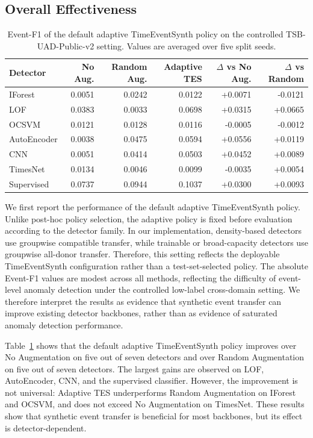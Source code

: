 \documentclass[conference]{IEEEtran}
\begin{document}
\FloatBarrier
\subsection{Overall Effectiveness}
\label{sec:overall_effectiveness}

\begin{table}[!t]
\centering
\caption{Event-F1 of the default adaptive TimeEventSynth policy on the controlled TSB-UAD-Public-v2 setting.  Values are averaged over five split seeds.}
\label{tab:adaptive_main_results}
\begin{tabular}{lrrrrr}
\toprule
Detector & No Aug. & Random Aug. & Adaptive TES & $\Delta$ vs No Aug. & $\Delta$ vs Random \\
\midrule
IForest     & 0.0051 & 0.0242 & 0.0122 & +0.0071 & -0.0121 \\
LOF         & 0.0383 & 0.0033 & 0.0698 & +0.0315 & +0.0665 \\
OCSVM       & 0.0121 & 0.0128 & 0.0116 & -0.0005 & -0.0012 \\
AutoEncoder & 0.0038 & 0.0475 & 0.0594 & +0.0556 & +0.0119 \\
CNN         & 0.0051 & 0.0414 & 0.0503 & +0.0452 & +0.0089 \\
TimesNet    & 0.0134 & 0.0046 & 0.0099 & -0.0035 & +0.0054 \\
Supervised  & 0.0737 & 0.0944 & 0.1037 & +0.0300 & +0.0093 \\
\bottomrule
\end{tabular}
\end{table}


We first report the performance of the default adaptive TimeEventSynth policy.
Unlike post-hoc policy selection, the adaptive policy is fixed before evaluation according to the detector family. In our implementation, density-based detectors
use groupwise compatible transfer, while trainable or broad-capacity detectors use groupwise all-donor transfer. Therefore, this setting reflects the deployable TimeEventSynth configuration rather than a test-set-selected policy. The absolute Event-F1 values are modest across all methods, reflecting the difficulty of event-level anomaly detection under the controlled low-label
cross-domain setting. We therefore interpret the results as evidence that synthetic event transfer can improve existing detector backbones, rather than as evidence of saturated anomaly detection performance.


Table~\ref{tab:adaptive_main_results} shows that the default adaptive
TimeEventSynth policy improves over No Augmentation on five out of seven
detectors and over Random Augmentation on five out of seven detectors. The
largest gains are observed on LOF, AutoEncoder, CNN, and the supervised
classifier. However, the improvement is not universal: Adaptive TES underperforms
Random Augmentation on IForest and OCSVM, and does not exceed No Augmentation on
TimesNet. These results show that synthetic event transfer is beneficial for
most backbones, but its effect is detector-dependent.
\end{document}
